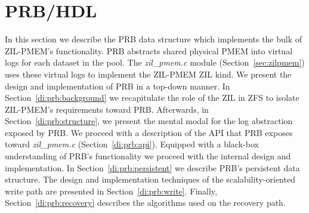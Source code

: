 \documentclass[12pt,a4paper,twoside]{book}
\begin{document}
\section{PRB/HDL}
In this section we describe the PRB data structure which implements the bulk of ZIL-PMEM's functionality.
PRB abstracts shared physical PMEM into virtual logs for each dataset in the pool.
The \textit{zil\_pmem.c} module (Section~\ref{sec:zilpmem}) uses these virtual logs to implement the ZIL-PMEM ZIL kind.
We present the design and implementation of PRB in a top-down manner.
In Section~\ref{di:prb:background} we recapitulate the role of the ZIL in ZFS to isolate ZIL-PMEM's requirements toward PRB.
Afterwards, in Section~\ref{di:prb:structure}, we present the mental modal for the log abstraction exposed by PRB.
We proceed with a description of the API that PRB exposes toward \textit{zil\_pmem.c} (Section~\ref{di:prb:api}).
Equipped with a black-box understanding of PRB's functionality we proceed with the internal design and implementation.
In Section~\ref{di:prb:persistent} we describe PRB's persistent data structure.
The design and implementation techniques of the scalability-oriented write path are presented in Section~\ref{di:prb:write}.
Finally, Section~\ref{di:prb:recovery} describes the algorithms used on the recovery path.
\end{document}
